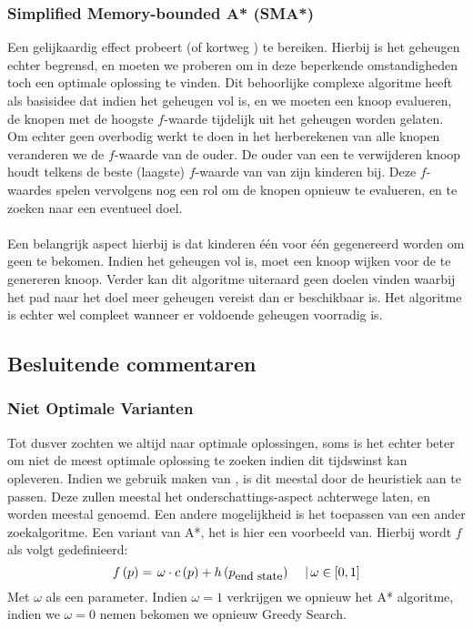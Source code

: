 \subsubsection{Simplified Memory-bounded A* (SMA*)}
Een gelijkaardig effect probeert  (of kortweg ) te bereiken. Hierbij is het geheugen echter begrensd, en moeten we proberen om in deze beperkende omstandigheden toch een optimale oplossing te vinden. Dit behoorlijke complexe algoritme heeft als basisidee dat indien het geheugen vol is, en we moeten een knoop evalueren, de knopen met de hoogste $f$-waarde tijdelijk uit het geheugen worden gelaten. Om echter geen overbodig werkt te doen in het herberekenen van alle knopen veranderen we de $f$-waarde van de ouder. De ouder van een te verwijderen knoop houdt telkens de beste (laagste) $f$-waarde van van zijn kinderen bij. Deze $f$-waardes spelen vervolgens nog een rol om de knopen opnieuw te evalueren, en te zoeken naar een eventueel doel.
\paragraph{}Een belangrijk aspect hierbij is dat kinderen één voor één gegenereerd worden om geen  te bekomen. Indien het geheugen vol is, moet een knoop wijken voor de te genereren knoop. Verder kan dit algoritme uiteraard geen doelen vinden waarbij het pad naar het doel meer geheugen vereist dan er beschikbaar is. Het algoritme is echter wel compleet wanneer er voldoende geheugen voorradig is.
\subsection{Besluitende commentaren}
\subsubsection{Niet Optimale Varianten}
Tot dusver zochten we altijd naar optimale oplossingen, soms is het echter beter om niet de meest optimale oplossing te zoeken indien dit tijdswinst kan opleveren. Indien we gebruik maken van , is dit meestal door de heuristiek aan te passen. Deze zullen meestal het onderschattings-aspect achterwege laten, en worden meestal  genoemd. Een andere mogelijkheid is het toepassen van een ander zoekalgoritme. Een variant van A*, het  is hier een voorbeeld van. Hierbij wordt $f$ als volgt gedefinieerd:
\begin{equation}
f\left(p\right)=\left.\omega\cdot c\left(p\right)+h\left(p_{\mbox{\small{end state}}}\right)\ \ \ \ \right|\omega\in\left[0,1\right]
\end{equation}
Met $\omega$ als een parameter. Indien $\omega=1$ verkrijgen we opnieuw het A* algoritme, indien we $\omega=0$ nemen bekomen we opnieuw Greedy Search.
